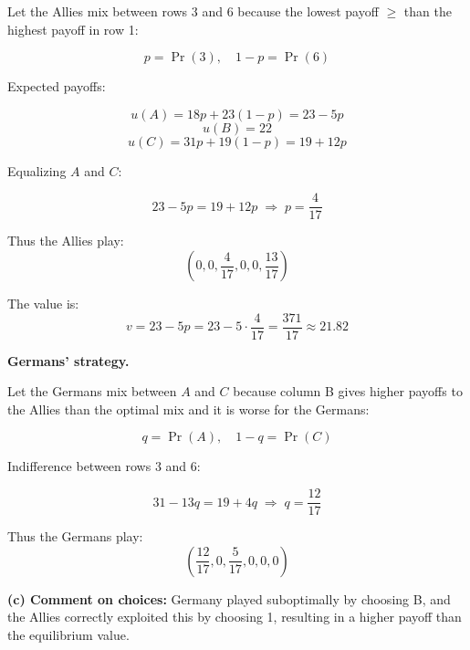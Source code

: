 Let the Allies mix between rows \(3\) and \(6\) because the lowest payoff \(\ge\) than the highest payoff in row 1:

\[
p = \Pr(3), \quad 1-p = \Pr(6)
\]

Expected payoffs:

\[
u(A) = 18p + 23(1-p) = 23 - 5p
\]
\[
u(B) = 22
\]
\[
u(C) = 31p + 19(1-p) = 19 + 12p
\]

Equalizing \(A\) and \(C\):

\[
23 - 5p = 19 + 12p \;\Rightarrow\; p = \frac{4}{17}
\]

Thus the Allies play:
\[
\left(0,0,\frac{4}{17},0,0,\frac{13}{17}\right)
\]

The value is:
\[
v = 23 - 5p = 23 - 5 \cdot \frac{4}{17} = \frac{371}{17} \approx 21.82
\]

\textbf{Germans' strategy.}

Let the Germans mix between \(A\) and \(C\) because column
B gives higher payoffs to the Allies than the optimal mix and it is worse for the Germans:

\[
q = \Pr(A), \quad 1-q = \Pr(C)
\]

Indifference between rows \(3\) and \(6\):

\[
31 - 13q = 19 + 4q \;\Rightarrow\; q = \frac{12}{17}
\]

Thus the Germans play:
\[
\left(\frac{12}{17},0,\frac{5}{17},0,0,0\right)
\]

\textbf{(c) Comment on choices:}
Germany played suboptimally by choosing
B, and the Allies correctly exploited this by choosing
1, resulting in a higher payoff than the equilibrium value.

